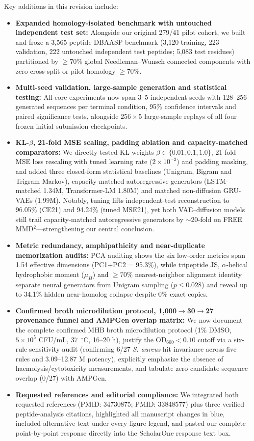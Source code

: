 \documentclass[10pt,a4paper]{article}
\begin{document}
Key additions in this revision include:
\begin{itemize}[leftmargin=1.4em,itemsep=2pt,topsep=3pt]
\item \textbf{Expanded homology-isolated benchmark with untouched independent test set:} Alongside our original 279/41 pilot cohort, we built and froze a 3,565-peptide DBAASP benchmark (3,120 training, 223 validation, 222 untouched independent test peptides; 5,083 test residues) partitioned by $\geq$70\% global Needleman--Wunsch connected components with zero cross-split or pilot homology $\geq$70\%.
\item \textbf{Multi-seed validation, large-sample generation and statistical testing:} All core experiments now span 3--5 independent seeds with 128--256 generated sequences per terminal condition, 95\% confidence intervals and paired significance tests, alongside $256\times 5$ large-sample replays of all four frozen initial-submission checkpoints.
\item \textbf{KL-$\beta$, 21-fold MSE scaling, padding ablation and capacity-matched comparators:} We directly tested KL weights $\beta\in\{0.01,0.1,1.0\}$, 21-fold MSE loss rescaling with tuned learning rate ($2\times 10^{-3}$) and padding masking, and added three closed-form statistical baselines (Unigram, Bigram and Trigram Markov), capacity-matched autoregressive generators (LSTM-matched 1.34M, Transformer-LM 1.80M) and matched non-diffusion GRU-VAEs (1.99M). Notably, tuning lifts independent-test reconstruction to 96.05\% (CE21) and 94.24\% (tuned MSE21), yet both VAE--diffusion models still trail capacity-matched autoregressive generators by $\sim$20-fold on FREE MMD$^2$---strengthening our central conclusion.
\item \textbf{Metric redundancy, amphipathicity and near-duplicate memorization audits:} PCA auditing shows the six low-order metrics span 1.54 effective dimensions (PC1+PC2 = 95.3\%), while tripeptide JS, $\alpha$-helical hydrophobic moment ($\mu_H$) and $\geq$70\% nearest-neighbor alignment identity separate neural generators from Unigram sampling ($p\leq 0.028$) and reveal up to 34.1\% hidden near-homolog collapse despite 0\% exact copies.
\item \textbf{Confirmed broth microdilution protocol, 1,000$\rightarrow$30$\rightarrow$27 provenance funnel and AMPGen overlap matrix:} We now document the complete confirmed MHB broth microdilution protocol (1\% DMSO, $5\times 10^5$ CFU/mL, 37~$^\circ$C, 16--20 h), justify the OD$_{600}<0.10$ cutoff via a six-rule sensitivity audit (confirming 6/27 \textit{S. aureus} hit invariance across five rules and 3.09--12.87 \textmu{}M potency), explicitly emphasize the absence of haemolysis/cytotoxicity measurements, and tabulate zero candidate sequence overlap (0/27) with AMPGen.
\item \textbf{Requested references and editorial compliance:} We integrated both requested references (PMID: 34730875; PMID: 33848577) plus three verified peptide-analysis citations, highlighted all manuscript changes in blue, included alternative text under every figure legend, and pasted our complete point-by-point response directly into the ScholarOne response text box.
\end{itemize}
\end{document}
